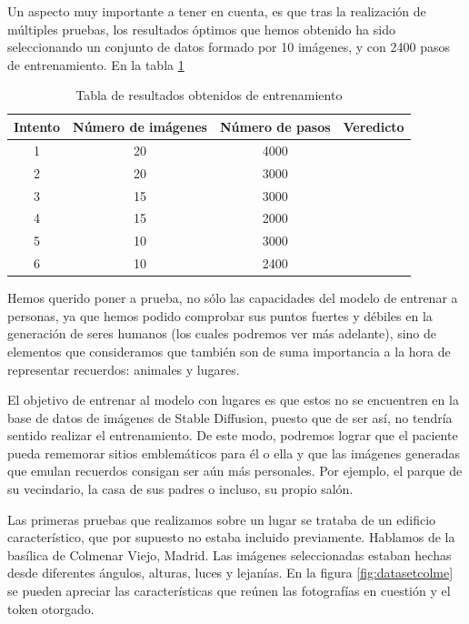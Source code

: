 Un aspecto muy importante a tener en cuenta, es que tras la realización de múltiples pruebas, los resultados óptimos que hemos obtenido ha sido seleccionando un conjunto de datos formado por 10 imágenes, y con 2400 pasos de entrenamiento. En la tabla \ref{tab:resultadosentrenamiento}\\


\begin{table}
	\centering
	\begin{tabular}{c|c|c|c}
		\textbf{Intento} & \textbf{Número de imágenes} & \textbf{Número de pasos} & \textbf{Veredicto} \\
		\hline\hline
		1 & 20 & 4000 & \\
		2 & 20 & 3000 & \\
		3 & 15 & 3000 & \\
		4 & 15 & 2000 & \\
		5 & 10 & 3000 & \\
		6 & 10 & 2400 & \\
		\hline
	\end{tabular}
	\caption{Tabla de resultados obtenidos de entrenamiento}
	\label{tab:resultadosentrenamiento}
\end{table}



Hemos querido poner a prueba, no sólo las capacidades del modelo de entrenar a personas, ya que hemos podido comprobar sus puntos fuertes y débiles en la generación de seres humanos (los cuales podremos ver más adelante), sino de elementos que consideramos que también son de suma importancia a la hora de representar recuerdos: animales y lugares. 

El objetivo de entrenar al modelo con lugares es que estos no se encuentren en la base de datos de imágenes de Stable Diffusion, puesto que de ser así, no tendría sentido realizar el entrenamiento. De este modo, podremos lograr que el paciente pueda rememorar sitios emblemáticos para él o ella y que las imágenes generadas que emulan recuerdos consigan ser aún más personales. Por ejemplo, el parque de su vecindario, la casa de sus padres o incluso, su propio salón. 

Las primeras pruebas que realizamos sobre un lugar se trataba de un edificio característico, que por supuesto no estaba incluido previamente. Hablamos de la basílica de Colmenar Viejo, Madrid. Las imágenes seleccionadas estaban hechas desde diferentes ángulos, alturas, luces y lejanías. En la figura \ref{fig:datasetcolme} se pueden apreciar las características que reúnen las fotografías en cuestión y el token otorgado.

